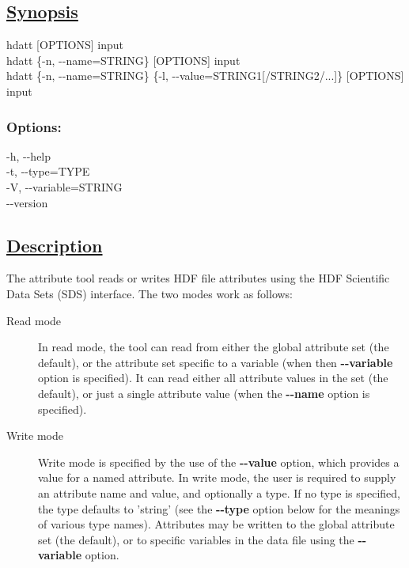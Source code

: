 \subsection*{\underline{Synopsis}}


  hdatt [OPTIONS] input\\ 
 hdatt \{-n, -{-}name=STRING\} [OPTIONS] input\\ 
 hdatt \{-n, -{-}name=STRING\} \{-l, -{-}value=STRING1[/STRING2/...]\} [OPTIONS] input\\ 

\subsubsection*{Options:}


  -h, -{-}help\\ 
 -t, -{-}type=TYPE\\ 
 -V, -{-}variable=STRING\\ 
 -{-}version \\ 

\subsection*{\underline{Description}}


 The attribute tool reads or writes HDF file attributes using the HDF Scientific Data Sets (SDS) interface. The two modes work as follows:
\begin{description}
\item[Read mode]In read mode, the tool can read from either the global attribute set (the default), or the attribute set specific to a variable (when then \textbf{-{-}variable}
 option is specified). It can read either all attribute values in the set (the default), or just a single attribute value (when the \textbf{-{-}name}
 option is specified).
\item[Write mode]Write mode is specified by the use of the \textbf{-{-}value}
 option, which provides a value for a named attribute. In write mode, the user is required to supply an attribute name and value, and optionally a type. If no type is specified, the type defaults to 'string' (see the \textbf{-{-}type}
 option below for the meanings of various type names). Attributes may be written to the global attribute set (the default), or to specific variables in the data file using the \textbf{-{-}variable}
 option.

\end{description}


